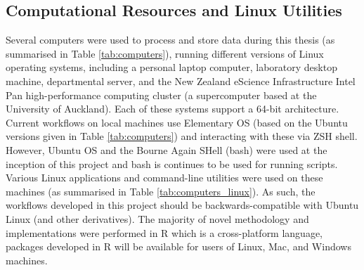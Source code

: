 \subsection{Computational Resources and Linux Utilities}

Several computers were used to process and store data during this thesis (as summarised in Table \ref{tab:computers}), running different versions of Linux operating systems, including a personal laptop computer, laboratory desktop machine, departmental server, and the New Zealand eScience Infrastructure Intel Pan high-performance computing cluster (a supercomputer based at the University of Auckland). Each of these systems support a 64-bit architecture. Current workflows on local machines use Elementary OS (based on the Ubuntu versions given in Table \ref{tab:computers}) and interacting with these via ZSH shell. However, Ubuntu OS and the Bourne Again SHell (bash) were used at the inception of this project and bash is continues to be used for running scripts. Various Linux applications and command-line utilities were used on these machines (as summarised in Table \ref{tab:computers_linux}). As such, the workflows developed in this project should be backwards-compatible with Ubuntu Linux (and other derivatives). The majority of novel methodology and implementations were performed in R which is a cross-platform language, packages developed in R will be available for users of Linux, Mac, and Windows machines.  


